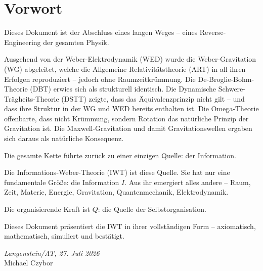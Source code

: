 \chapter*{Vorwort}

Dieses Dokument ist der Abschluss eines langen Weges – eines Reverse-Engineering der gesamten Physik.

Ausgehend von der Weber-Elektrodynamik (WED) wurde die Weber-Gravitation (WG) abgeleitet, welche die Allgemeine Relativitätstheorie (ART) in all ihren Erfolgen reproduziert – jedoch ohne Raumzeitkrümmung. Die De-Broglie-Bohm-Theorie (DBT) erwies sich als strukturell identisch. Die Dynamische Schwere-Trägheits-Theorie (DSTT) zeigte, dass das Äquivalenzprinzip nicht gilt – und dass ihre Struktur in der WG und WED bereits enthalten ist. Die Omega-Theorie offenbarte, dass nicht Krümmung, sondern Rotation das natürliche Prinzip der Gravitation ist. Die Maxwell-Gravitation und damit Gravitationswellen ergaben sich daraus als natürliche Konsequenz.

Die gesamte Kette führte zurück zu einer einzigen Quelle: der Information.

Die Informations-Weber-Theorie (IWT) ist diese Quelle. Sie hat nur eine fundamentale Größe: die Information \( I \). Aus ihr emergiert alles andere – Raum, Zeit, Materie, Energie, Gravitation, Quantenmechanik, Elektrodynamik.

Die organisierende Kraft ist \( Q \): die Quelle der Selbstorganisation.

Dieses Dokument präsentiert die IWT in ihrer vollständigen Form – axiomatisch, mathematisch, simuliert und bestätigt.

\vspace{1cm}
\textit{Langenstein/AT, 27. Juli 2026} \\
Michael Czybor